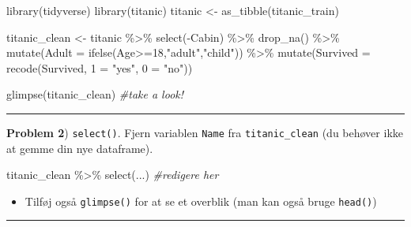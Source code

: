 \documentclass[
]{book}
\newenvironment{Shaded}{\begin{snugshade}}{\end{snugshade}}
\newcommand{\AttributeTok}[1]{\textcolor[rgb]{0.77,0.63,0.00}{#1}}
\newcommand{\CommentTok}[1]{\textcolor[rgb]{0.56,0.35,0.01}{\textit{#1}}}
\newcommand{\DecValTok}[1]{\textcolor[rgb]{0.00,0.00,0.81}{#1}}
\newcommand{\FunctionTok}[1]{\textcolor[rgb]{0.00,0.00,0.00}{#1}}
\newcommand{\NormalTok}[1]{#1}
\newcommand{\OtherTok}[1]{\textcolor[rgb]{0.56,0.35,0.01}{#1}}
\newcommand{\SpecialCharTok}[1]{\textcolor[rgb]{0.00,0.00,0.00}{#1}}
\newcommand{\StringTok}[1]{\textcolor[rgb]{0.31,0.60,0.02}{#1}}
\providecommand{\tightlist}{%
  \setlength{\itemsep}{0pt}\setlength{\parskip}{0pt}}
\begin{document}
\begin{Shaded}
\begin{Highlighting}[]
\FunctionTok{library}\NormalTok{(tidyverse)}
\FunctionTok{library}\NormalTok{(titanic)}
\NormalTok{titanic }\OtherTok{\textless{}{-}} \FunctionTok{as\_tibble}\NormalTok{(titanic\_train)}

\NormalTok{titanic\_clean }\OtherTok{\textless{}{-}}\NormalTok{ titanic }\SpecialCharTok{\%\textgreater{}\%} 
    \FunctionTok{select}\NormalTok{(}\SpecialCharTok{{-}}\NormalTok{Cabin) }\SpecialCharTok{\%\textgreater{}\%} 
    \FunctionTok{drop\_na}\NormalTok{() }\SpecialCharTok{\%\textgreater{}\%} 
    \FunctionTok{mutate}\NormalTok{(}\AttributeTok{Adult =} \FunctionTok{ifelse}\NormalTok{(Age}\SpecialCharTok{\textgreater{}=}\DecValTok{18}\NormalTok{,}\StringTok{"adult"}\NormalTok{,}\StringTok{"child"}\NormalTok{)) }\SpecialCharTok{\%\textgreater{}\%}
    \FunctionTok{mutate}\NormalTok{(}\AttributeTok{Survived =} \FunctionTok{recode}\NormalTok{(Survived,  }\StringTok{\textasciigrave{}}\AttributeTok{1}\StringTok{\textasciigrave{}} \OtherTok{=} \StringTok{"yes"}\NormalTok{, }\StringTok{\textasciigrave{}}\AttributeTok{0}\StringTok{\textasciigrave{}} \OtherTok{=} \StringTok{"no"}\NormalTok{)) }
    
\FunctionTok{glimpse}\NormalTok{(titanic\_clean) }\CommentTok{\#take a look!}
\end{Highlighting}
\end{Shaded}

\begin{center}\rule{0.5\linewidth}{0.5pt}\end{center}

\textbf{Problem 2}) \texttt{select()}. Fjern variablen \texttt{Name} fra \texttt{titanic\_clean} (du behøver ikke at gemme din nye dataframe).

\begin{Shaded}
\begin{Highlighting}[]
\NormalTok{titanic\_clean }\SpecialCharTok{\%\textgreater{}\%} 
    \FunctionTok{select}\NormalTok{(...) }\CommentTok{\#redigere her}
\end{Highlighting}
\end{Shaded}

\begin{itemize}
\tightlist
\item
  Tilføj også \texttt{glimpse()} for at se et overblik (man kan også bruge \texttt{head()})
\end{itemize}

\begin{center}\rule{0.5\linewidth}{0.5pt}\end{center}
\end{document}
